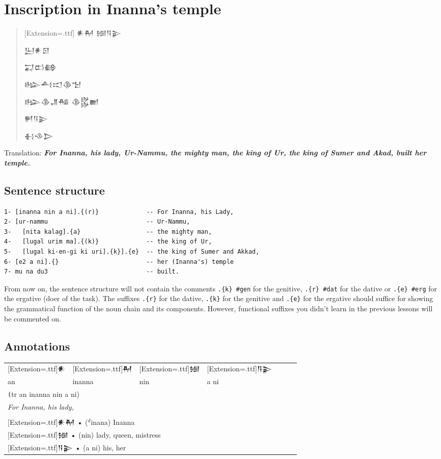 \documentclass[a4paper,12pt]{book}
\newcommand{\fcn}{\setmainfont{Akkadian}[Extension=.ttf]}
\newcommand{\fcm}{\large\setmainfont{Akkadian}[Extension=.ttf]}
\begin{document}
\chapter{Inscription in Inanna's temple}

\begin{quotation}\LARGE\fcn
  𒀭𒈹 𒎏𒀀𒉌
  
  𒌨𒀭𒇉
  
  𒍑𒆗𒂵
  
  𒈗𒋀𒀊𒆠𒈠
  
  𒈗𒆠𒂗𒄀 𒆠𒌵𒆤
  
  𒂍𒀀𒉌
  
𒈬𒈾𒆕
\end{quotation}

Translation:
{\bf\em For Inanna, his lady, Ur-Nammu,
  the mighty man, the king of Ur,
  the king of Sumer and Akad, built her temple.}

\section{Sentence structure}
\begin{verbatim}
1- [inanna nin a ni].{(r)}             -- For Inanna, his Lady,
2- [ur-nammu                           -- Ur-Nammu,
3-   [nita kalag].{a}                  -- the mighty man,
4-   [lugal urim ma].{(k)}             -- the king of Ur,
5-   [lugal ki-en-gi ki uri].{k}].{e}  -- the king of Sumer and Akkad,
6- [e2 a ni].{}                        -- her (Inanna's) temple
7- mu na du3                           -- built.
\end{verbatim}

\newpage
From now on, the sentence structure
will not contain the comments \verb|.{k} #gen|
for the genitive, \verb|.{r} #dat| for the dative
or \verb|.{e} #erg| for the ergative (doer of the task).
The suffixes \verb|.{r}| for the dative,
\verb|.{k}| for the genitive
and \verb|.{e}| for the ergative
should suffice for showing the grammatical
function of the noun chain and its components.
However, functional suffixes you didn't learn
in the previous lessons will be commented on.

\section{Annotations}

\begin{tabular}[!h]{l l l l l l l}
  \fcm 𒀭 &\fcm 𒈹
  &\fcm 𒎏 &\fcm 𒀀𒉌\\
  an & inanna & nin & a ni\\
  \multicolumn{4}{l}{\texttt (tr an inanna nin a ni)}\\
  \multicolumn{4}{l}{\em For Inanna, his lady,}\\
  \hline\\
  \multicolumn{4}{l}{{\fcn 𒀭𒈹} • ($^d$inana) Inanna}\\
  \multicolumn{4}{l}{{\fcn 𒎏} • (nin) lady, queen, mistress}\\
  \multicolumn{4}{l}{{\fcn 𒀀𒉌} • (a ni) his, her}\\
\end{tabular}\verb||\\
\end{document}
